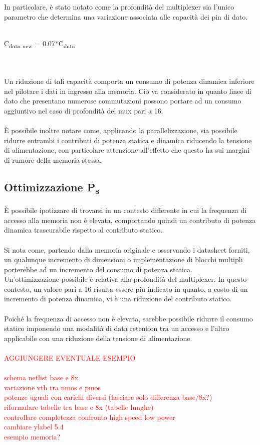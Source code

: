 \documentclass[11pt,  english, makeidx, a4paper, titlepage, oneside]{book}
\begin{document}
\\\\
In particolare, è stato notato come la profondità del multiplexer sia l'unico parametro che determina una variazione associata alle capacità dei pin di dato.
\\\\
\centerline{C\textsubscript{data new} = 0.07*C\textsubscript{data}}
\\\\
Un riduzione di tali capacità comporta un consumo di potenza dinamica inferiore nel pilotare i dati in ingresso alla memoria. Ciò va considerato in quanto linee di dato che presentano numerose commutazioni possono portare ad un consumo aggiuntivo nel caso di profondità del mux pari a 16.
\\\\
È possibile inoltre notare come, applicando la parallelizzazione, sia possibile ridurre entrambi i contributi di potenza statica e dinamica riducendo la tensione di alimentazione, con particolare attenzione all'effetto che questo ha sui margini di rumore della memoria stessa.
\subsection{Ottimizzazione P\textsubscript{s}}
È possibile ipotizzare di trovarsi in un contesto differente in cui la frequenza di accesso alla memoria non è elevata, comportando quindi un contributo di potenza dinamica trascurabile rispetto al contributo statico.
\\\\
Si nota come, partendo dalla memoria originale e osservando i datasheet forniti, un qualunque incremento di dimensioni o implementazione di blocchi multipli porterebbe ad un incremento del consumo di potenza statica.
\\
Un'ottimizzazione possibile è relativa alla profondità del multiplexer. In questo contesto, un valore pari a 16 risulta essere più indicato in quanto, a costo di un incremento di potenza dinamica, vi è una riduzione del contributo statico.
\\\\
Poiché la frequenza di accesso non è elevata, sarebbe possibile ridurre il consumo statico imponendo una modalità di data retention tra un accesso e l'altro applicabile con una riduzione della tensione di alimentazione.
\\\\
\textcolor{red}{AGGIUNGERE EVENTUALE ESEMPIO}
\\\\
\textcolor{red}{
schema netlist base e 8x\\
variazione vth tra nmos e pmos\\
potenze uguali con carichi diversi (lasciare solo differenza base/8x?)\\
riformulare tabelle tra base e 8x (tabelle lunghe)\\
controllare completezza confronto high speed low power\\
cambiare ylabel 5.4\\
esempio memoria?
}
\end{document}
